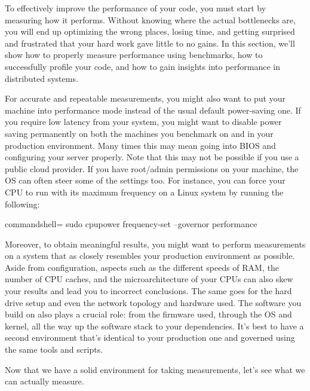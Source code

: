 

To effectively improve the performance of your code, you must start by measuring how it performs. Without knowing where the actual bottlenecks are, you will end up optimizing the wrong places, losing time, and getting surprised and frustrated that your hard work gave little to no gains. In this section, we'll show how to properly measure performance using benchmarks, how to successfully profile your code, and how to gain insights into performance in distributed systems.


For accurate and repeatable measurements, you might also want to put your machine into performance mode instead of the usual default power-saving one. If you require low  latency from your system, you might want to disable power saving permanently on both the machines you benchmark on and in your production environment. Many times this may mean going into BIOS and configuring your server properly. Note that this may not be possible if you use a public cloud provider. If you have root/admin permissions on your machine, the OS can often steer some of the settings too. For instance, you can force your CPU to run with its maximum frequency on a Linux system by running the following:

\begin{tcblisting}{commandshell={}}
sudo cpupower frequency-set --governor performance
\end{tcblisting}

Moreover, to obtain meaningful results, you might want to perform measurements on a system that as closely resembles your production environment as possible. Aside from configuration, aspects such as the different speeds of RAM, the number of CPU caches, and the microarchitecture of your CPUs can also skew your results and lead you to incorrect conclusions. The same goes for the hard drive setup and even the network topology and hardware used. The software you build on also plays a crucial role: from the firmware used, through the OS and kernel, all the way up the software stack to your dependencies. It's best to have a second environment that's identical to your production one and governed using the same tools and scripts.

Now that we have a solid environment for taking measurements, let's see what we can actually measure.


